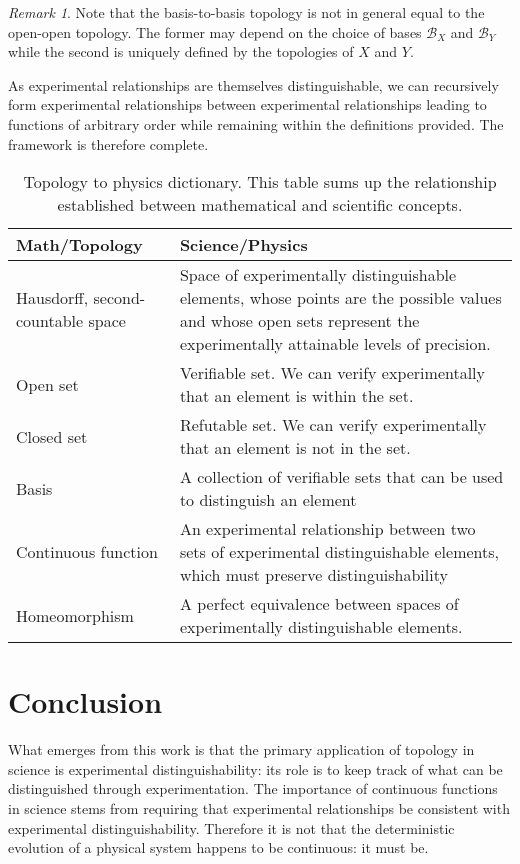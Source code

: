 \documentclass[preprint]{elsarticle}
\theoremstyle{plain}%
\theoremstyle{definition}
\theoremstyle{remark}
\newtheorem*{rem}{Remark}
\begin{document}
\begin{rem}
	Note that the basis-to-basis topology is not in general equal to the open-open topology. The former may depend on the choice of bases $\mathcal{B}_X$ and $\mathcal{B}_Y$ while the second is uniquely defined by the topologies of $X$ and $Y$.
\end{rem}

As experimental relationships are themselves distinguishable, we can recursively form experimental relationships between experimental relationships leading to functions of arbitrary order while remaining within the definitions provided. The framework is therefore complete.

\begin{table}[h]
	\centering
	\begin{tabular}{p{} p{}}
		Math/Topology & Science/Physics \\ 
		\hline 
		Hausdorff, second-countable space & Space of experimentally distinguishable elements, whose points are the possible values and whose open sets represent the experimentally attainable levels of precision. \\
		Open set & Verifiable set. We can verify experimentally that an element is within the set.  \\ 
		Closed set & Refutable set. We can verify experimentally that an element is not in the set. \\ 
		Basis & A collection of verifiable sets that can be used to distinguish an element\\
		Continuous \newline function &  An experimental relationship between two sets of experimental distinguishable elements, which must preserve distinguishability \\
		Homeomorphism &  A perfect equivalence between spaces of experimentally distinguishable elements. \\
	\end{tabular} 
	\caption{Topology to physics dictionary. This table sums up the relationship established between mathematical and scientific concepts.}
\end{table}


\section{Conclusion}

What emerges from this work is that the primary application of topology in science is experimental distinguishability: its role is to keep track of what can be distinguished through experimentation. The importance of continuous functions in science stems from requiring that experimental relationships be consistent with experimental distinguishability. Therefore it is not that the deterministic evolution of a physical system happens to be continuous: it must be.
\end{document}

